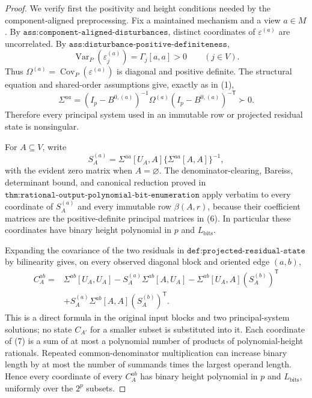 \documentclass{article}
\begin{document}
\begin{proof}
We verify first the positivity and height conditions needed by the component-aligned preprocessing.  Fix a maintained mechanism and a view \(a\in M\).  By \(\texttt{ass:component-aligned-disturbances}\), distinct coordinates of \(\varepsilon^{(a)}\) are uncorrelated.  By \(\texttt{ass:disturbance-positive-definiteness}\),
\[
 \operatorname{Var}_P(\varepsilon_j^{(a)})
 =\Gamma_j[a,a]>0
 \qquad (j\in V).
\tag{5}
\]
Thus \(\Omega^{(a)}=\operatorname{Cov}_P(\varepsilon^{(a)})\) is diagonal and positive definite.  The structural equation and shared-order assumptions give, exactly as in (1),
\[
 \Sigma^{aa}=(I_p-B^{0,(a)})^{-1}
 \Omega^{(a)}(I_p-B^{0,(a)})^{-\mathsf T}\succ0.
\tag{6}
\]
Therefore every principal system used in an immutable row or projected residual state is nonsingular.

For \(A\subseteq V\), write
\[
 S_A^{(a)}=\Sigma^{aa}[U_A,A]
 \{\Sigma^{aa}[A,A]\}^{-1},
\]
with the evident zero matrix when \(A=\varnothing\).  The denominator-clearing, Bareiss, determinant bound, and canonical reduction proved in \(\texttt{thm:rational-output-polynomial-bit-enumeration}\) apply verbatim to every coordinate of \(S_A^{(a)}\) and every immutable row \(\beta(A,r)\), because their coefficient matrices are the positive-definite principal matrices in (6).  In particular these coordinates have binary height polynomial in \(p\) and \(L_{\mathrm{bits}}\).

Expanding the covariance of the two residuals in \(\texttt{def:projected-residual-state}\) by bilinearity gives, on every observed diagonal block and oriented edge \((a,b)\),
\[
 \begin{aligned}
 C_A^{ab}
 ={}&\Sigma^{ab}[U_A,U_A]
 -S_A^{(a)}\Sigma^{ab}[A,U_A]
 -\Sigma^{ab}[U_A,A](S_A^{(b)})^{\mathsf T}\\
 &+S_A^{(a)}\Sigma^{ab}[A,A](S_A^{(b)})^{\mathsf T}.
 \end{aligned}
\tag{7}
\]
This is a direct formula in the original input blocks and two principal-system solutions; no state \(C_{A'}\) for a smaller subset is substituted into it.  Each coordinate of (7) is a sum of at most a polynomial number of products of polynomial-height rationals.  Repeated common-denominator multiplication can increase binary length by at most the number of summands times the largest operand length.  Hence every coordinate of every \(C_A^{ab}\) has binary height polynomial in \(p\) and \(L_{\mathrm{bits}}\), uniformly over the \(2^p\) subsets.


\end{proof}
\end{document}
